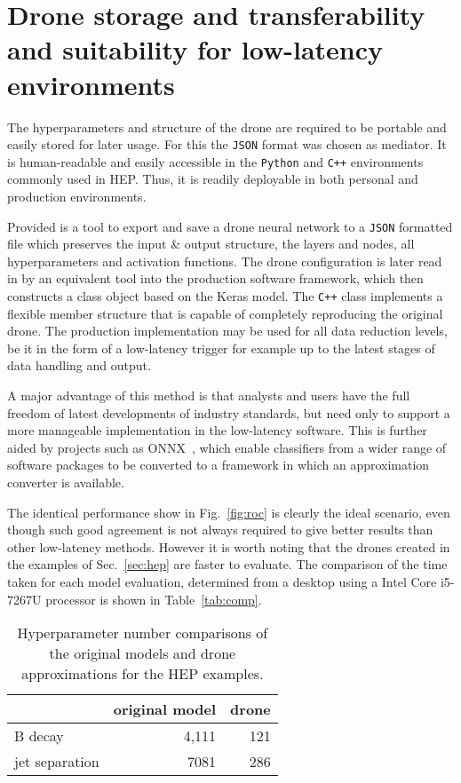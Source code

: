 \section{Drone storage and transferability and suitability
for low-latency environments}
\label{sec:storage}

The hyperparameters and structure of the drone are required to be
portable and easily stored for later usage. For this the {\tt JSON} format was chosen as
mediator. It is human-readable and easily accessible in the {\tt Python} and {\tt C++}
environments commonly used in HEP. Thus, it is readily deployable in both personal and production environments.

Provided is a tool to export and save a drone neural network to a {\tt JSON}
formatted file which preserves the input \& output structure,
the layers and nodes, all hyperparameters and activation functions.
The drone configuration is later read in by an equivalent tool into the production software framework,
which then constructs a class object based on the Keras model. The {\tt C++} class implements
a flexible member structure that is capable of completely reproducing the original drone. The production
implementation may be used for all data reduction levels, be it in the form of a low-latency trigger
for example up to the latest stages of data handling and output.

A major advantage of this method is that analysts and users have the full freedom of latest developments
of industry standards, but need only to support a more manageable implementation in the low-latency
software. This is further aided by projects such as ONNX~\cite{ONNX}, which enable classifiers from a wider
range of software packages to be converted to a framework in which an approximation converter
is available.

The identical performance show in Fig.~\ref{fig:roc} is clearly the ideal scenario, even though
such good agreement is not always required to give better results than other low-latency methods.
However it is worth noting that the drones created in the examples of Sec.~\ref{sec:hep} are faster to
evaluate. The comparison of the time taken for each model evaluation, determined from a desktop
using a Intel Core i5-7267U processor is shown in Table~\ref{tab:comp}.
\begin{table}[t]
  \centering
  \caption{Hyperparameter number comparisons of the original models and drone
  approximations for the HEP examples. \label{tab:comp_param}}
  \begin{tabular}{l|rr}
                   & original model                  & drone \\
    \hline
    B decay        & 4,111 & 121 \\
    jet separation & 7081 & 286 \\
  \end{tabular}
\end{table}

